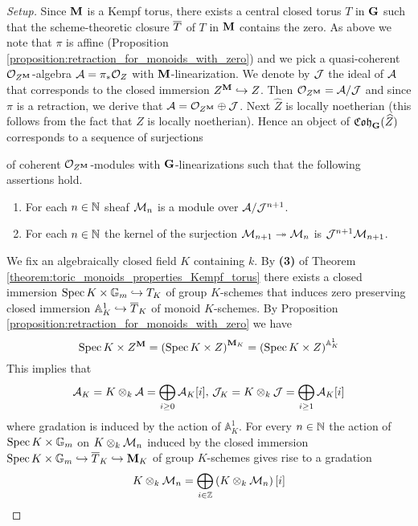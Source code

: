 \begin{proof}[Setup]
Since $\mathbf{M}$ is a Kempf torus, there exists a central closed torus $T$ in $\mathbf{G}$ such that the scheme-theoretic closure $\overline{T}$ of $T$ in $\mathbf{M}$ contains the zero. As above we note that $\pi$ is affine (Proposition \ref{proposition:retraction_for_monoids_with_zero}) and we pick a quasi-coherent ${\mathcal O}_{Z^{\mathbf{M}}}$-algebra ${\mathcal A} = \pi_*{\mathcal O}_Z$ with $\mathbf{M}$-linearization. We denote by ${\mathcal J}$ the ideal of ${\mathcal A}$ that corresponds to the closed immersion $Z^{\mathbf{M}}\hookrightarrow Z$. Then ${\mathcal O}_{Z^{\mathbf{M}}} = {\mathcal A}/{\mathcal J}$ and since $\pi$ is a retraction, we derive that ${\mathcal A} = {\mathcal O}_{Z^{\mathbf{M}}}\oplus {\mathcal J}$. Next $\widehat{Z}$ is locally noetherian (this follows from the fact that $Z$ is locally noetherian). Hence an object of $\mathfrak{Coh}_{\mathbf{G}}(\widehat{Z})$ corresponds to a sequence of surjections
\begin{center}
\end{center}
of coherent ${\mathcal O}_{Z^{\mathbf{M}}}$-modules with $\mathbf{G}$-linearizations such that the following assertions hold.
\begin{enumerate}[label=\textbf{(\arabic*)}, leftmargin=1.5em]
\item For each $n\in {\mathbb N}$ sheaf ${\mathcal M}_n$ is a module over ${\mathcal A}/{\mathcal J}^{n+1}$.
\item For each $n\in {\mathbb N}$ the kernel of the surjection ${\mathcal M}_{n+1}\twoheadrightarrow {\mathcal M}_n$ is ${\mathcal J}^{n+1}{\mathcal M}_{n+1}$.
\end{enumerate}
We fix an algebraically closed field $K$ containing $k$. By \textbf{(3)} of Theorem \ref{theorem:toric_monoids_properties_Kempf_torus} there exists a closed immersion $\mathrm{Spec}\, K\times \mathbb{G}_m\hookrightarrow T_K$ of group $K$-schemes that induces zero preserving closed immersion $\mathbb{A}^1_K\hookrightarrow \overline{T}_K$ of monoid $K$-schemes. By Proposition \ref{proposition:retraction_for_monoids_with_zero} we have
$$\mathrm{Spec}\, K\times Z^{\mathbf{M}} = \left(\mathrm{Spec}\, K\times Z\right)^{\mathbf{M}_K} = \left(\mathrm{Spec}\, K\times Z\right)^{\mathbb{A}^1_K}$$
This implies that
$${\mathcal A}_K = K\otimes_k{\mathcal A} = \bigoplus_{i\geq 0}{\mathcal A}_K[i],\,{\mathcal J}_K = K\otimes_k{\mathcal J} = \bigoplus_{i\geq 1}{\mathcal A}_K[i]$$
where gradation is induced by the action of $\mathbb{A}^1_K$. For every $n\in {\mathbb N}$ the action of $\mathrm{Spec}\, K\times \mathbb{G}_m$ on $K\otimes_k{\mathcal M}_n$ induced by the closed immersion $\mathrm{Spec}\, K\times \mathbb{G}_m \hookrightarrow \overline{T}_K\hookrightarrow \mathbf{M}_K$ of group $K$-schemes gives rise to a gradation
$$K\otimes_k{\mathcal M}_n = \bigoplus_{i\in {\mathbb Z}}\left(K\otimes_k{\mathcal M}_n\right)[i]$$
\end{proof}

